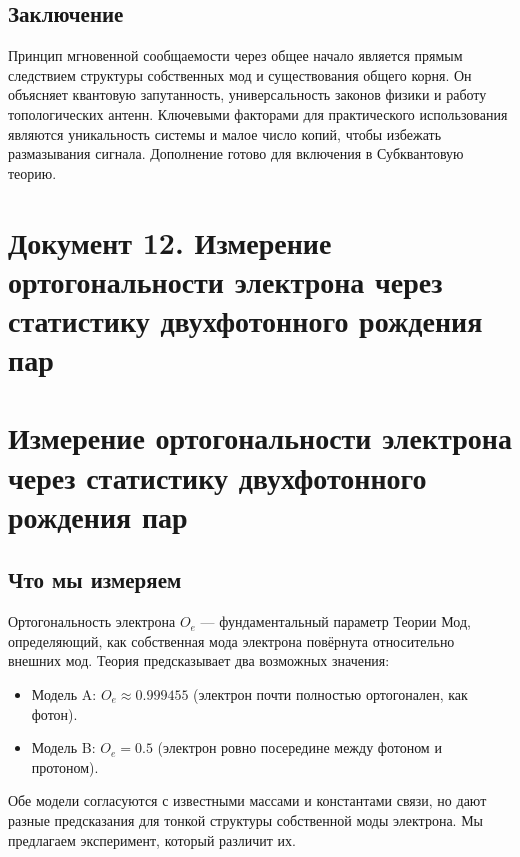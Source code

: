 \documentclass[12pt,a4paper]{article}
\begin{document}
\subsection{Заключение}
Принцип мгновенной сообщаемости через общее начало является прямым следствием структуры собственных мод и существования общего корня. Он объясняет квантовую запутанность, универсальность законов физики и работу топологических антенн. Ключевыми факторами для практического использования являются уникальность системы и малое число копий, чтобы избежать размазывания сигнала. Дополнение готово для включения в Субквантовую теорию.


\newpage
\section*{Документ 12. Измерение ортогональности электрона через статистику двухфотонного рождения пар}

\section{Измерение ортогональности электрона через статистику двухфотонного рождения пар}

\subsection{Что мы измеряем}
Ортогональность электрона $O_e$ — фундаментальный параметр Теории Мод, определяющий, как собственная мода электрона повёрнута относительно внешних мод. Теория предсказывает два возможных значения:

\begin{itemize}
    \item Модель A: $O_e \approx 0.999455$ (электрон почти полностью ортогонален, как фотон).
    \item Модель B: $O_e = 0.5$ (электрон ровно посередине между фотоном и протоном).
\end{itemize}

Обе модели согласуются с известными массами и константами связи, но дают разные предсказания для тонкой структуры собственной моды электрона. Мы предлагаем эксперимент, который различит их.
\end{document}
